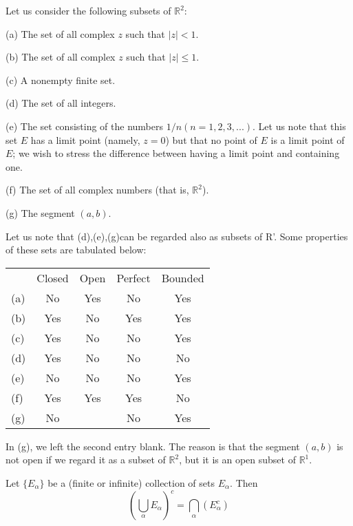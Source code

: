 \begin{myExample}
    Let us consider the following subsets of $\mathbb{R}^2$:

(a) The set of all complex $z$ such that $|z| < 1$.

(b) The set of all complex $z$ such that $|z| \leq 1$.

(c) A nonempty finite set.

(d) The set of all integers.

(e) The set consisting of the numbers $1/n(n=1,2,3,...)$. Let us note that this set $E$ has a limit point (namely, $z =0$) but that no point of $E$ is a limit point of $E$; we wish to stress the difference between having a limit point and containing one.

(f) The set of all complex numbers (that is, $\mathbb{R}^2$).

(g) The segment $(a,b)$.
\end{myExample}

Let us note that (d),(e),(g)can be regarded also as subsets of R'.
Some properties of these sets are tabulated below:


\begin{table}[htbp]
    \begin{center}
    \begin{tabular}{lcccc}
        & Closed & Open & Perfect & Bounded \\
    (a) & No     & Yes  & No      & Yes     \\
    (b) & Yes    & No   & Yes     & Yes     \\
    (c) & Yes    & No   & No      & Yes     \\
    (d) & Yes    & No   & No      & No      \\
    (e) & No     & No   & No      & Yes     \\
    (f) & Yes    & Yes  & Yes     & No      \\
    (g) & No     &      & No      & Yes    
    \end{tabular}
    \end{center}
\end{table}

In (g), we left the second entry blank. The reason is that the segment $(a,b)$ is not open if we regard it as a subset of $\mathbb{R}^2$, but it is an open subset of $\mathbb{R}^1$.


\begin{thm}\label{thm:2.22}
    Let $\{E_\alpha\}$ be a (finite or infinite) collection of sets $E_\alpha$. Then
    \begin{equation}
        \left(\bigcup_{\alpha} E_{\alpha} \right)^c = \bigcap_{\alpha}( E_{\alpha}^c )
    \end{equation}
\end{thm}

